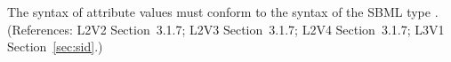 The syntax of  attribute values must conform to the syntax of the
SBML type .  (References: L2V2 Section~3.1.7;
L2V3 Section~3.1.7; L2V4 Section~3.1.7; L3V1 Section~\ref{sec:sid}.)
